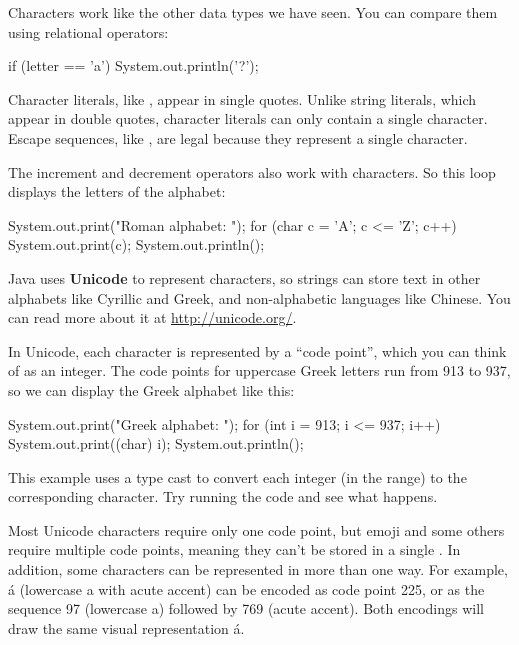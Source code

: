 Characters work like the other data types we have seen.
You can compare them using relational operators:

\begin{code}
	if (letter == 'a') {
		System.out.println('?');
	}
\end{code}


Character literals, like , appear in single quotes.
Unlike string literals, which appear in double quotes, character literals can only contain a single character.
Escape sequences, like , are legal because they represent a single character.

The increment and decrement operators also work with characters.
So this loop displays the letters of the alphabet:

\begin{code}
	System.out.print("Roman alphabet: ");
	for (char c = 'A'; c <= 'Z'; c++) {
		System.out.print(c);
	}
	System.out.println();
\end{code}


Java uses {\bf Unicode} to represent characters, so strings can store text in other alphabets like Cyrillic and Greek, and non-alphabetic languages like Chinese.
You can read more about it at \url{http://unicode.org/}.

In Unicode, each character is represented by a ``code point'', which you can think of as an integer.
The code points for uppercase Greek letters run from 913 to 937, so we can display the Greek alphabet like this:

\begin{code}
	System.out.print("Greek alphabet: ");
	for (int i = 913; i <= 937; i++) {
		System.out.print((char) i);
	}
	System.out.println();
\end{code}

This example uses a type cast to convert each integer (in the range) to the corresponding character.
Try running the code and see what happens.

Most Unicode characters require only one code point, but emoji and some others require multiple code points, meaning they can't be stored in a single . In addition, some characters can be represented in more than one way. For example, \'a (lowercase a with acute accent) can be encoded as code point 225, or as the sequence 97 (lowercase a) followed by 769 (acute accent). Both encodings will draw the same visual representation \'a.

